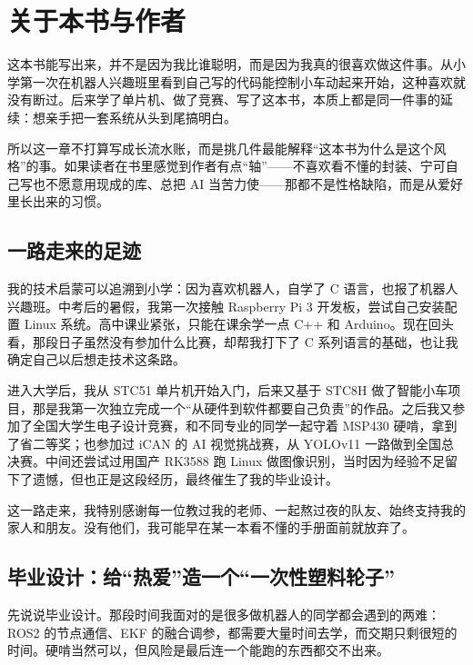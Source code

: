 \chapter{关于本书与作者} \label{ch:about-author}

这本书能写出来，并不是因为我比谁聪明，而是因为我真的很喜欢做这件事。从小学第一次在机器人兴趣班里看到自己写的代码能控制小车动起来开始，这种喜欢就没有断过。后来学了单片机、做了竞赛、写了这本书，本质上都是同一件事的延续：想亲手把一套系统从头到尾搞明白。

所以这一章不打算写成长流水账，而是挑几件最能解释“这本书为什么是这个风格”的事。如果读者在书里感觉到作者有点“轴”——不喜欢看不懂的封装、宁可自己写也不愿意用现成的库、总把 AI 当苦力使——那都不是性格缺陷，而是从爱好里长出来的习惯。

\section{一路走来的足迹}

我的技术启蒙可以追溯到小学：因为喜欢机器人，自学了 C 语言，也报了机器人兴趣班。中考后的暑假，我第一次接触 Raspberry Pi 3 开发板，尝试自己安装配置 Linux 系统。高中课业紧张，只能在课余学一点 C++ 和 Arduino。现在回头看，那段日子虽然没有参加什么比赛，却帮我打下了 C 系列语言的基础，也让我确定自己以后想走技术这条路。

进入大学后，我从 STC51 单片机开始入门，后来又基于 STC8H 做了智能小车项目，那是我第一次独立完成一个“从硬件到软件都要自己负责”的作品。之后我又参加了全国大学生电子设计竞赛，和不同专业的同学一起守着 MSP430 硬啃，拿到了省二等奖；也参加过 iCAN 的 AI 视觉挑战赛，从 YOLOv11 一路做到全国总决赛。中间还尝试过用国产 RK3588 跑 Linux 做图像识别，当时因为经验不足留下了遗憾，但也正是这段经历，最终催生了我的毕业设计。

这一路走来，我特别感谢每一位教过我的老师、一起熬过夜的队友、始终支持我的家人和朋友。没有他们，我可能早在某一本看不懂的手册面前就放弃了。

\section{毕业设计：给“热爱”造一个“一次性塑料轮子”}

先说说毕业设计。那段时间我面对的是很多做机器人的同学都会遇到的两难：ROS2 的节点通信、EKF 的融合调参，都需要大量时间去学，而交期只剩很短的时间。硬啃当然可以，但风险是最后连一个能跑的东西都交不出来。

